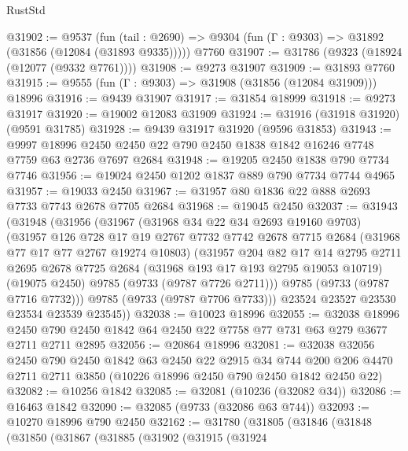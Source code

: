 \begin{lexlean}{RustStd}
\begin{coremodule}
{\begin{coremodule}
{{{{{{{{{{{{{{{{{{{{{{{{{{{{{{{{{{{{{{{{{{{{{{{{{{{{{{{@31902 := @9537
    (fun (tail : @2690) => @9304 (fun (Γ : @9303) => @31892 (@31856 (@12084 (@31893 @9335)))))
    @7760
@31907 := @31786 (@9323 (@18924 (@12077 (@9332 @7761))))
@31908 := @9273 @31907
@31909 := @31893 @7760
@31915 := @9555 (fun (Γ : @9303) => @31908 (@31856 (@12084 @31909))) @18996
@31916 := @9439 @31907
@31917 := @31854 @18999
@31918 := @9273 @31917
@31920 := @19002 @12083 @31909
@31924 := @31916 (@31918 @31920) (@9591 @31785)
@31928 := @9439 @31917 @31920 (@9596 @31853)
@31943 := @9997
    @18996
    @2450
    @2450
    @22
    @790
    @2450
    @1838
    @1842
    @16246
    @7748
    @7759
    @63
    @2736
    @7697
    @2684
@31948 := @19205 @2450 @1838 @790 @7734 @7746
@31956 := @19024 @2450 @1202 @1837 @889 @790 @7734 @7744 @4965
@31957 := @19033 @2450
@31967 := @31957 @80 @1836 @22 @888 @2693 @7733 @7743 @2678 @7705 @2684
@31968 := @19045 @2450
@32037 := @31943
    (@31948
      (@31956
        (@31967
          (@31968 @34 @22 @34 @2693 @19160 @9703)
          (@31957
            @126
            @728
            @17
            @19
            @2767
            @7732
            @7742
            @2678
            @7715
            @2684
            (@31968 @77 @17 @77 @2767 @19274 @10803)
            (@31957
              @204
              @82
              @17
              @14
              @2795
              @2711
              @2695
              @2678
              @7725
              @2684
              (@31968 @193 @17 @193 @2795 @19053 @10719)
              (@19075 @2450)
              @9785
              (@9733 (@9787 @7726 @2711)))
            @9785
            (@9733 (@9787 @7716 @7732)))
          @9785
          (@9733 (@9787 @7706 @7733)))
        @23524
        @23527
        @23530
        @23534
        @23539
        @23545))
@32038 := @10023 @18996
@32055 := @32038
    @18996
    @2450
    @790
    @2450
    @1842
    @64
    @2450
    @22
    @7758
    @77
    @731
    @63
    @279
    @3677
    @2711
    @2711
    @2895
@32056 := @20864 @18996
@32081 := @32038
    @32056
    @2450
    @790
    @2450
    @1842
    @63
    @2450
    @22
    @2915
    @34
    @744
    @200
    @206
    @4470
    @2711
    @2711
    @3850
    (@10226 @18996 @2450 @790 @2450 @1842 @2450 @22)
@32082 := @10256 @1842
@32085 := @32081 (@10236 (@32082 @34))
@32086 := @16463 @1842
@32090 := @32085 (@9733 (@32086 @63 @744))
@32093 := @10270 @18996 @790 @2450
@32162 := @31780
    (@31805
      (@31846
        (@31848
          (@31850
            (@31867
              (@31885
                (@31902
                  (@31915
                    (@31924
}}}}}}}}}}}}}}}}}}}}}}}}}}}}}}}}}}}}}}}}}}}}}}}}}}}}}}}
\end{coremodule}}
\end{coremodule}
\end{lexlean}
